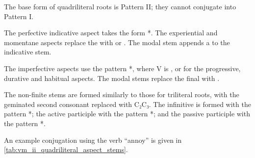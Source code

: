 \documentclass[grammar]{subfiles}
\begin{document}
The base form of quadriliteral roots is Pattern II; they cannot conjugate into
Pattern I. 

The perfective indicative aspect takes the form *. The
experiential and momentane aspects replace the  with  or .
The modal stem appends a  to the indicative stem. 

The imperfective aspects use the pattern *, where V is
,  or  for the progressive, durative and habitual aspects.
The modal stems replace the final  with .  

The non-finite stems are formed similarly to those for triliteral roots, with
the geminated second consonant replaced with C₂C₃.  The infinitive is formed
with the pattern *; the active participle with the pattern
*; and the passive participle with the pattern
*.

An example conjugation using the verb  “annoy” is given in
\cref{tab:vm_ii_quadriliteral_aspect_stems}. 

\begin{table}[h!]\small\capstart
  \centering
  \\
  \caption{Pattern II quadriliteral stems\label{tab:vm_ii_quadriliteral_aspect_stems}}
\end{table}
\end{document}
